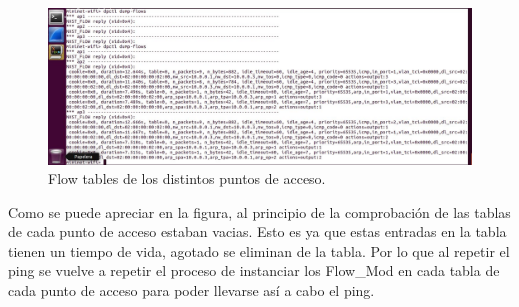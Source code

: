 \begin{figure}[!htb]
  \centering
    \includegraphics[width=\linewidth]{./img/17.JPG}
    \caption{Flow tables de los distintos puntos de acceso.}
  \label{fig:yo}
\end{figure}
\newline
Como se puede apreciar en la figura, al principio de la comprobación de las tablas de cada punto de acceso estaban vacias. Esto es ya que estas entradas en la tabla tienen un tiempo de vida, agotado se eliminan de la tabla. Por lo que al repetir el ping se vuelve a repetir el proceso de instanciar los Flow\_Mod en cada tabla de cada punto de acceso para poder llevarse así a cabo el ping. \newline
\newline

